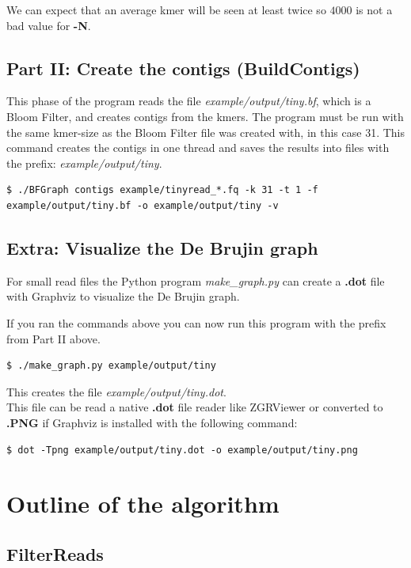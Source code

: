 \documentclass[a4paper]{report}
\renewcommand{\b}[1]{\textbf{#1}}  %
\newcommand{\e}[1]{\emph{#1}}    %
\begin{document}
We can expect that an average kmer will be seen at least twice so $4000$ is not a bad value for \b{-N}.

\newpage
\section{Part II: Create the contigs (BuildContigs)}
This phase of the program reads the file \e{example/output/tiny.bf}, which is a Bloom Filter, and creates contigs from the kmers. 
The program must be run with the same kmer-size as the Bloom Filter file was created with, in this case 31.
This command creates the contigs in one thread and saves the results into files with the prefix: \e{example/output/tiny}.
\footnotesize
\begin{verbatim}
$ ./BFGraph contigs example/tinyread_*.fq -k 31 -t 1 -f example/output/tiny.bf -o example/output/tiny -v
\end{verbatim}
\normalsize

\section{Extra: Visualize the De Brujin graph}
For small read files the Python program \e{make\_graph.py} can create a \b{.dot} file with Graphviz\cite{graphviz} 
to visualize the De Brujin graph.

If you ran the commands above you can now run this program with the prefix from Part II above.
\begin{verbatim}
$ ./make_graph.py example/output/tiny
\end{verbatim}

This creates the file \e{example/output/tiny.dot}.\\[4pt]

This file can be read a native \b{.dot} file reader like ZGRViewer\cite{zgr} or converted to \b{.PNG} if Graphviz is installed with the following command:
\begin{verbatim}
$ dot -Tpng example/output/tiny.dot -o example/output/tiny.png
\end{verbatim}

\chapter{Outline of the algorithm}

\section{FilterReads}
\end{document}
